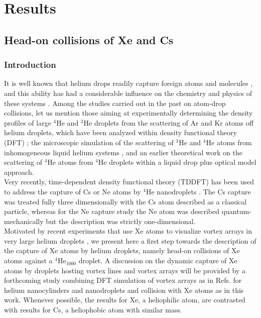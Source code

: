\chapter{Results}
	\section{Head-on collisions of Xe and Cs}
	
		\subsection{Introduction}\label{introduction}

			It is well known that helium drops readily capture foreign atoms and molecules \cite{Sch90}, and this ability has had a considerable influence on the chemistry and physics of these systems \cite{Toe04}. Among the studies carried out in the past on atom-drop collisions, let us mention those aiming at experimentally determining the density profiles of large $^4$He and $^3$He droplets from the scattering of Ar and Kr atoms off  helium droplets, which have been analyzed within density functional theory  (DFT) \cite{Har98,Har01}; the microscopic simulation of the scattering of $^3$He and $^4$He atoms from inhomogeneous liquid helium systems \cite{Kro07,Kro08}, and an earlier theoretical work on the scattering of $^4$He atoms from $^4$He droplets within a liquid drop plus optical model approach\citep{Eic88}.\\
 
 			Very recently, time-dependent density functional theory (TDDFT) has been used to address the capture of Cs or Ne atoms by $^4$He nanodroplets \cite{Lea14,Vil16}. The Cs capture was treated fully three dimensionally with the Cs atom described as a classical particle, whereas for the Ne capture study the Ne atom was described quantum-mechanically but the description was strictly one-dimensional.\\
 			
 			Motivated by recent experiments that use Xe atoms to visualize vortex arrays in very large helium droplets \cite{Gom14,Jon16}, we present here a first step towards the description of the capture  of Xe atoms by helium droplets, namely head-on collisions of Xe atoms against a $^4$He$_{1000}$ droplet. A discussion on the dynamic capture of Xe atoms by droplets hosting vortex lines and vortex arrays will be provided by a forthcoming study combining DFT simulation of vortex arrays as in Refs. \cite{Anc14,Anc15} for helium nanocylinders and nanodroplets  and collision with Xe atoms as in this work. Whenever possible, the results for Xe, a heliophilic atom,  are contrasted with results for Cs, a heliophobic atom with similar mass.


